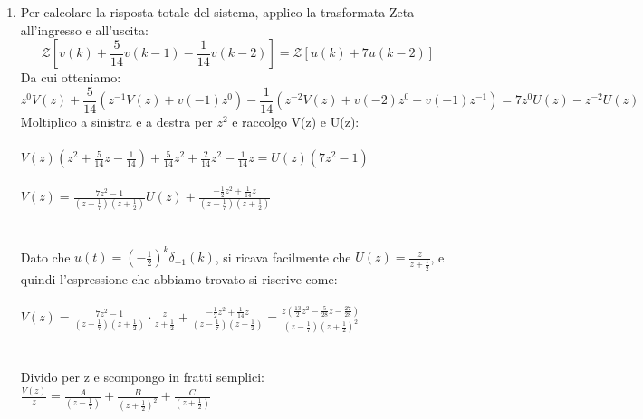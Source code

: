 \documentclass[12pt,a4paper]{article}
\begin{document}
\begin{enumerate}
		Quindi l'espressione di $\frac{H(z)}{z}$ si pu\`o riscrivere, scomposta, come:
		\[
			\frac{H(z)}{z} = \frac{14}{z} - \frac{28}{3} \frac{1}{\left(z-\frac{1}{7}\right)} + \frac{7}{3}\frac{1}{\left(z+\frac{1}{2}\right)}
		\]
		Moltiplico per z e antitrasformo, ottenendo cos\`i l'espressione finale della risposta impulsiva:
		\[
			h(t) = 14\delta(k) - \left[ \frac{28}{3}\left(\frac{1}{7}\right)^k\delta(k-1) + \frac{7}{3}\left(-\frac{1}{2}\right)^k\delta(k-2)\right]\delta_{-1}(k)
		\]
		\item Per calcolare la risposta totale del sistema, applico la trasformata Zeta all'ingresso e all'uscita:
		\[
			\mathcal{Z}\left[ v(k) + \frac{5}{14}v(k-1) -\frac{1}{14}v(k-2) \right] = \mathcal{Z} \left[ u(k) + 7u(k-2) \right]
		\]
		Da cui otteniamo:
		\[
			z^0V(z) + \frac{5}{14}\left( z^{-1}V(z) + v(-1)z^0 \right) - \frac{1}{14}\left( z^{-2} V(z) + v(-2) z^0 + v(-1)z^{-1}\right) = 7z^0U(z) - z^{-2}U(z)
		\]
		Moltiplico a sinistra e a destra per $z^2$ e raccolgo V(z) e U(z): \\ \\
		$V(z)(z^2 + \frac{5}{14}z - \frac{1}{14}) + \frac{5}{14}z^2 + \frac{2}{14}z^2 - \frac{1}{14}z = U(z)(7z^2-1)$ \\ \\
		$V(z) = \frac{7z^2-1}{\left(z-\frac{1}{7}\right) \left( z + \frac{1}{2} \right)}U(z) + \frac{-\frac{1}{2}z^2 + \frac{1}{14}z}{\left(z-\frac{1}{7}\right) \left( z + \frac{1}{2} \right)} $ \\ \\ \\
		Dato che $	u(t) = \left(-\frac{1}{2}\right)^k\delta_{-1}(k) $, si ricava facilmente che $U(z) = \frac{z}{z + \frac{1}{2}}$, e quindi l'espressione che abbiamo trovato si riscrive come:\\ \\
		$ V(z)= \frac{7z^2-1}{\left(z-\frac{1}{7}\right) \left( z + \frac{1}{2} \right)} \cdot \frac{z}{z + \frac{1}{2}} + \frac{-\frac{1}{2}z^2 + \frac{1}{14}z}{\left(z-\frac{1}{7}\right) \left( z + \frac{1}{2} \right)} = \frac{z\left(\frac{13}{2}z^2 - \frac{5}{28}z - \frac{27}{28}\right)}{\left(z-\frac{1}{7}\right) \left(z + \frac{1}{2}\right)^2} $ \\ \\ \\
		Divido per z e scompongo in fratti semplici:
		$\frac{V(z)}{z} = \frac{A}{\left(z-\frac{1}{7}\right)} + \frac{B}{ \left( z + \frac{1}{2} \right)^2} + \frac{C}{\left( z + \frac{1}{2} \right)}$ \\ \\ \\

\end{enumerate}
\end{document}

